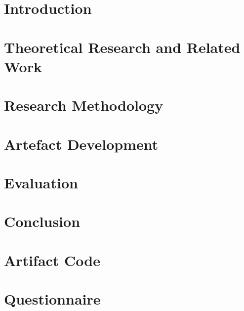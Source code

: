 \documentclass[12pt]{report}
\begin{document}

\pagestyle{fancy}
\rfoot{\thepage}
\cfoot{}





%
%

%
\newpage
\tableofcontents
\listoffigures
\listoftables
\clearpage

\pagestyle{plain}

\chapter{Introduction}
\label{sec:intro}


\chapter{Theoretical Research and Related Work}
\label{sec:relatedwork}


\chapter{Research Methodology}
\label{sec:methods}


\chapter{Artefact Development}
\label{sec:implementation}


\chapter{Evaluation}
\label{sec:experiments}


\chapter{Conclusion}
\label{sec:conclusion}


\newpage




\newpage

\appendix
{}
\chapter{Artifact Code}
\label{sec:Artifact Code}

\chapter{Questionnaire}
\label{sec:Questionnaire}

\end{document}
